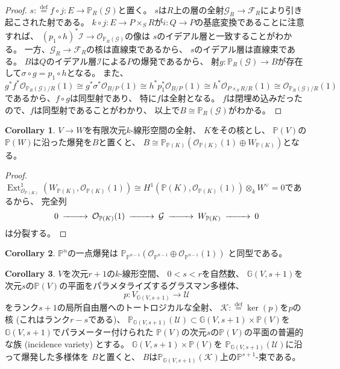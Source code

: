 \documentclass[uplatex]{jsarticle}
\theoremstyle{definition}
\newtheorem{cor}[cor]{Corollary}
\DeclareMathOperator{\Ext}{\mathrm{Ext}}
\renewcommand{\P}{\mathbb{P}}
\newcommand{\mcF}{\mathcal{F}}
\newcommand{\mcG}{\mathcal{G}}
\newcommand{\mcI}{\mathcal{I}}
\newcommand{\mcK}{\mathcal{K}}
\newcommand{\mcO}{\mathcal{O}}
\newcommand{\mcU}{\mathcal{U}}
\newcommand{\OOO}{\mcO}
\newcommand{\OO}[1]{\OOO_{#1}}
\newcommand{\dfn}{:\overset{\mathrm{def}}{=}}
\begin{document}
\begin{proof}
  \(s\dfn f\circ j:E \to \P_R(\mcG)\)と置く。
  \(s\)は\(R\)上の層の全射\(\mcG_R\to \mcF_R\)により引き起こされた射である。
  \(k\circ j:E\to P\times_SR\)が\(i:Q\to P\)の基底変換であることに注意すれば、
  \((p_1\circ h)^*\mcI\to \OO{\P_R(\mcG)}\)の像は
  \(s\)のイデアル層と一致することがわかる。
  一方、\(\mcG_R\to \mcF_R\)の核は直線束であるから、
  \(s\)のイデアル層は直線束である。
  \(B\)は\(Q\)のイデアル層\(\mcI\)による\(P\)の爆発であるから、
  射\(g:\P_R(\mcG)\to B\)が存在して\(\sigma\circ g = p_1\circ h\)となる。
  また、
  \[
  g^*f^*\OO{\P_R(\mcG)/R}(1)\cong g^*\sigma^*\OO{B/P}(1)\cong
  h^*p_1^*\OO{B/P}(1)\cong h^*\OO{P\times_SR/R}(1)\cong \OO{\P_R(\mcG)/R}(1)
  \]
  であるから、\(f\circ g\)は同型射であり、
  特に\(f\)は全射となる。
  \(f\)は閉埋め込みだったので、\(f\)は同型射であることがわかり、
  以上で\(B\cong \P_R(\mcG)\)がわかる。
\end{proof}




\begin{cor}\label{cor: main}
  \(V\to W\)を有限次元\(k\)-線形空間の全射、
  \(K\)をその核とし、
  \(\P(V)\)の\(\P(W)\)に沿った爆発を\(B\)と置くと、
  \(B\cong \P_{\P(K)}(\OO{\P(K)}(1)\oplus W_{\P(K)})\)となる。
\end{cor}

\begin{proof}
  \(\Ext^1_{\OO{\P(K)}}(W_{\P(K)}, \OO{\P(K)}(1))
  \cong H^1(\P(K), \OO{\P(K)}(1))\otimes_kW^{\vee} = 0\)であるから、
  完全列
  \[
  \begin{CD}
    0 @>>> \OO{\P(K)}(1) @>>> \mcG @>>> W_{\P(K)} @>>> 0
  \end{CD}
  \]
  は分裂する。
\end{proof}


\begin{cor}
  \(\P^n\)の一点爆発は
  \(\P_{\P^{n-1}}(\OO{\P^{n-1}}\oplus \OO{\P^{n-1}}(1))\)
  と同型である。
\end{cor}


\begin{cor}
  \(V\)を次元\(r+1\)の\(k\)-線形空間、
  \(0<s<r\)を自然数、
  \(\mathbb{G}(V,s+1)\)を次元\(s\)の\(\P(V)\)の平面をパラメタライズするグラスマン多様体、
  \[
  p:V_{\mathbb{G}(V,s+1)}\to \mcU
  \]
  をランク\(s+1\)の局所自由層へのトートロジカルな全射、
  \(\mcK \dfn \ker(p)\)を\(p\)の核 (これはランク\(r-s\)である)、
  \(\P_{\mathbb{G}(V,s+1)}(\mcU)\subset \mathbb{G}(V,s+1)\times \P(V)\)を
  \(\mathbb{G}(V,s+1)\)でパラメーター付けられた
  \(\P(V)\)の次元\(s\)の\(\P(V)\)の平面の普遍的な族
  (incidence variety) とする。
  \(\mathbb{G}(V,s+1)\times \P(V)\)を
  \(\P_{\mathbb{G}(V,s+1)}(\mcU)\)に沿って爆発した多様体を
  \(B\)と置くと、
  \(B\)は\(\P_{\mathbb{G}(V,s+1)}(\mcK)\)上の\(\P^{s+1}\)-束である。
\end{cor}
\end{document}
